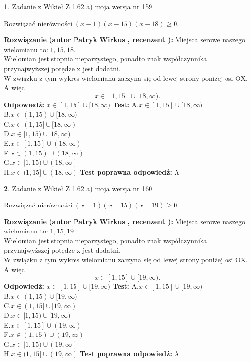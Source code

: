 \documentclass[12pt, a4paper]{article}
\theoremstyle{definition} %
\newtheorem{zad}{}
\newcommand{\zadStart}[1]{\begin{zad}#1\newline}
\newcommand{\zadStop}{\end{zad}}
\newcommand{\rozwStart}[2]{\noindent \textbf{Rozwiązanie (autor #1 , recenzent #2): }\newline}
\newcommand{\rozwStop}{\newline}
\newcommand{\odpStart}{\noindent \textbf{Odpowiedź:}\newline}
\newcommand{\odpStop}{\newline}
\newcommand{\testStart}{\noindent \textbf{Test:}\newline}
\newcommand{\testStop}{\newline}
\newcommand{\kluczStart}{\noindent \textbf{Test poprawna odpowiedź:}\newline}
\newcommand{\kluczStop}{\newline}
\begin{document}
\zadStart{Zadanie z Wikieł Z 1.62 a) moja wersja nr 159}

Rozwiązać nierówności $(x-1)(x-15)(x-18)\ge0$.
\zadStop
\rozwStart{Patryk Wirkus}{}
Miejsca zerowe naszego wielomianu to: $1, 15, 18$.\\
Wielomian jest stopnia nieparzystego, ponadto znak współczynnika przy\linebreak najwyższej potędze x jest dodatni.\\ W związku z tym wykres wielomianu zaczyna się od lewej strony poniżej osi OX. A więc $$x \in [1,15] \cup [18,\infty).$$
\rozwStop
\odpStart
$x \in [1,15] \cup [18,\infty)$
\odpStop
\testStart
A.$x \in [1,15] \cup [18,\infty)$\\
B.$x \in (1,15) \cup [18,\infty)$\\
C.$x \in (1,15] \cup [18,\infty)$\\
D.$x \in [1,15) \cup [18,\infty)$\\
E.$x \in [1,15] \cup (18,\infty)$\\
F.$x \in (1,15) \cup (18,\infty)$\\
G.$x \in [1,15) \cup (18,\infty)$\\
H.$x \in (1,15] \cup (18,\infty)$
\testStop
\kluczStart
A
\kluczStop



\zadStart{Zadanie z Wikieł Z 1.62 a) moja wersja nr 160}

Rozwiązać nierówności $(x-1)(x-15)(x-19)\ge0$.
\zadStop
\rozwStart{Patryk Wirkus}{}
Miejsca zerowe naszego wielomianu to: $1, 15, 19$.\\
Wielomian jest stopnia nieparzystego, ponadto znak współczynnika przy\linebreak najwyższej potędze x jest dodatni.\\ W związku z tym wykres wielomianu zaczyna się od lewej strony poniżej osi OX. A więc $$x \in [1,15] \cup [19,\infty).$$
\rozwStop
\odpStart
$x \in [1,15] \cup [19,\infty)$
\odpStop
\testStart
A.$x \in [1,15] \cup [19,\infty)$\\
B.$x \in (1,15) \cup [19,\infty)$\\
C.$x \in (1,15] \cup [19,\infty)$\\
D.$x \in [1,15) \cup [19,\infty)$\\
E.$x \in [1,15] \cup (19,\infty)$\\
F.$x \in (1,15) \cup (19,\infty)$\\
G.$x \in [1,15) \cup (19,\infty)$\\
H.$x \in (1,15] \cup (19,\infty)$
\testStop
\kluczStart
A
\kluczStop
\end{document}
